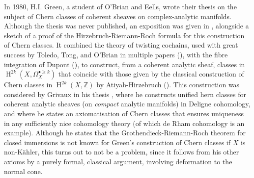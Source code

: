 \documentclass[11pt,fleqn]{article}
\theoremstyle{plain}
\theoremstyle{definition}
\theoremstyle{remark}
\numberwithin{equation}{theorem}
\DeclareMathOperator{\HH}{H}
\begin{document}
    In 1980, H.I. Green, a student of O'Brian and Eells, wrote their thesis \cite{Green1980} on the subject of Chern classes of coherent sheaves on complex-analytic manifolds.
    Although the thesis was never published, an exposition was given in \cite{Toledo&Tong1986}, alongside a sketch of a proof of the Hirzebruch-Riemann-Roch formula for this construction of Chern classes.
    It combined the theory of {twisting cochains}, used with great success by Toledo, Tong, and O'Brian in multiple papers (\cite{Toledo&Tong1976,Toledo&Tong1978,OBrian&etal1981,OBrian&etal1985}), with the {fibre integration} of Dupont (\cite{Dupont1976}), to construct, from a coherent analytic sheaf, classes in $\HH^{2k}(X,\Omega_X^{\bullet\geqslant k})$ that coincide with those given by the classical construction of Chern classes in $\HH^{2k}(X,\mathbb{Z})$ by Atiyah-Hirzebruch (\cite{Atiyah&Hirzebruch1962}).
    This construction was considered by Grivaux in his thesis \cite{Grivaux2009}, where he constructs unified hern classes for coherent analytic sheaves (on \emph{compact} analytic manifolds) in Deligne cohomology, and where he states an axiomatisation of Chern classes that ensures uniqueness in any sufficiently nice cohomology theory (of which de Rham cohomology is an example).
    Although he states that the Grothendieck-Riemann-Roch theorem for closed immersions is not known for Green's construction of Chern classes if $X$ is non-Kähler, this turns out to not be a problem, since it follows from his other axioms by a purely formal, classical argument, involving deformation to the normal cone.
\end{document}
